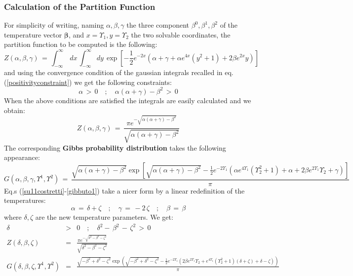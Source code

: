 \documentclass[10pt,a4paper]{article}
\begin{document}
\subsubsection{Calculation of the Partition Function}
For simplicity of writing, naming $\alpha,\beta,\gamma$ the three component $\beta^0, \beta^1,\beta^2$ of the temperature vector $\boldsymbol{\beta}$, and  $x=\Upsilon_1,y=\Upsilon_2$ the two solvable coordinates, the
partition function to be computed is the following:
\begin{equation}\label{partitona}
  Z(\alpha,\beta,\gamma) \, = \, \int_{-\infty}^\infty \, dx \, \int_{-\infty}^\infty dy \,
  \exp \left[-\frac{1}{2} e^{-2 x} \left(\alpha +\gamma +\alpha  e^{4 x}
   \left(y^2+1\right)+2 \beta  e^{2 x} y\right)\right]
\end{equation}
and using the convergence condition of the gaussian integrals recalled in eq.(\ref{positivityconstraint}) we get the following constraints:
\begin{equation}\label{su11costretti}
  \alpha \, > \, 0 \quad ; \quad \alpha  (\alpha +\gamma )-\beta ^2\, > \, 0
\end{equation}
When the above conditions are satisfied the integrals are easily calculated and we obtain:
\begin{equation}\label{zetofono}
  Z(\alpha,\beta,\gamma)\, = \, \frac{\pi  e^{-\sqrt{\alpha  (\alpha +\gamma )-\beta ^2}}}{\sqrt{\alpha  (\alpha
   +\gamma )-\beta ^2}}
\end{equation}
The corresponding \textbf{Gibbs probability distribution} takes the following appearance:
\begin{equation}\label{gibbuto1}
  G(\alpha,\beta,\gamma,\Upsilon^1,\Upsilon^2)\, = \, \frac{\sqrt{\alpha  (\alpha +\gamma )-\beta ^2} \exp \left[\sqrt{\alpha  (\alpha +\gamma
   )-\beta ^2}-\frac{1}{2} e^{-2 \Upsilon _1} \left(\alpha  e^{4 \Upsilon _1}
   \left(\Upsilon _2^2+1\right)+\alpha +2 \beta  e^{2 \Upsilon _1} \Upsilon _2+\gamma
   \right)\right]}{\pi }
\end{equation}
Eq.s (\ref{su11costretti}-\ref{gibbuto1}) take a nicer form by a linear redefinition of the  temperatures:
\begin{equation}\label{crisantemo}
  \alpha \, = \, \delta + \zeta \quad ; \quad \gamma \, = \, -2 \, \zeta \quad ; \quad \beta \, = \, \beta
\end{equation}
where $\delta,\zeta$ are the new temperature parameters. We get:
\begin{eqnarray}
  \delta &>& 0  \quad ; \quad \delta^2 - \, \beta^2 \, - \, \zeta^2 \, > \, 0 \label{omegaregion} \\
  {Z}(\delta,\beta,\zeta) &=& \frac{\pi  e^{-\sqrt{\delta ^2-\beta ^2-\zeta ^2}}}{\sqrt{\delta ^2-\beta ^2-\zeta ^2}}\label{Zfinta} \\
   {G}(\delta,\beta,\zeta,\Upsilon^1,\Upsilon^2) &=& \frac{\sqrt{-\beta ^2+\delta ^2-\zeta ^2} \exp \left(\sqrt{-\beta ^2+\delta ^2-\zeta
   ^2}-\frac{1}{2} e^{-2 \Upsilon _1} \left(2 \beta  e^{2 \Upsilon _1} \Upsilon _2+e^{4
   \Upsilon _1} \left(\Upsilon _2^2+1\right) (\delta +\zeta )+\delta -\zeta
   \right)\right)}{\pi }\nonumber\\
   \label{gibbuti2}
\end{eqnarray}
\end{document}
